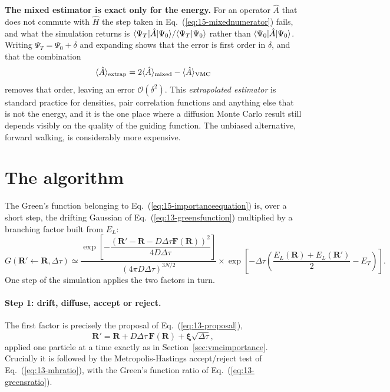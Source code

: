 \begin{notebox}
\textbf{The mixed estimator is exact only for the energy.}  For an operator
$\hat{A}$ that does not commute with $\hat{H}$ the step taken in
Eq.~(\ref{eq:15-mixednumerator}) fails, and what the simulation returns is
$\langle \Psi_T | \hat{A} | \Psi_0 \rangle/\langle \Psi_T \vert \Psi_0 \rangle$ rather than
$\langle \Psi_0 | \hat{A} | \Psi_0 \rangle$.  Writing $\Psi_T=\Psi_0+\delta$ and
expanding shows that the error is first order in $\delta$, and that the
combination
\begin{equation}
  \langle \hat{A} \rangle_{\mathrm{extrap}}
   = 2\langle \hat{A} \rangle_{\mathrm{mixed}} - \langle \hat{A} \rangle_{\mathrm{VMC}}
  \label{eq:15-extrapolated}
\end{equation}
removes that order, leaving an error $\mathcal{O}(\delta^2)$.  This
\emph{extrapolated estimator} is standard practice for densities, pair
correlation functions and anything else that is not the energy, and it is the
one place where a diffusion Monte Carlo result still depends visibly on the
quality of the guiding function.  The unbiased alternative, forward walking,
is considerably more expensive.
\end{notebox}

\section{The algorithm}
\label{sec:dmcalgorithm}

The Green's function belonging to Eq.~(\ref{eq:15-importanceequation}) is,
over a short step, the drifting Gaussian of Eq.~(\ref{eq:13-greensfunction})
multiplied by a branching factor built from $E_L$:
\begin{equation}
  G(\bm{R}'\!\leftarrow\!\bm{R},\Delta\tau)
   \simeq
     \frac{\exp\!\left[-\dfrac{\left(\bm{R}'-\bm{R}
       -D\Delta\tau\bm{F}(\bm{R})\right)^2}{4D\Delta\tau}\right]}
          {(4\pi D\Delta\tau)^{3N/2}}
   \times
     \exp\!\left[-\Delta\tau\left(
       \frac{E_L(\bm{R})+E_L(\bm{R}')}{2}-E_T\right)\right].
  \label{eq:15-fullgreens}
\end{equation}
One step of the simulation applies the two factors in turn.

\paragraph{Step 1: drift, diffuse, accept or reject.}
The first factor is precisely the proposal of Eq.~(\ref{eq:13-proposal}),
\begin{equation*}
  \bm{R}' = \bm{R} + D\Delta\tau\,\bm{F}(\bm{R})
    + \bm{\xi}\sqrt{\Delta\tau},
\end{equation*}
applied one particle at a time exactly as in
Section~\ref{sec:vmcimportance}.  Crucially it is followed by the
Metropolis-Hastings accept/reject test of Eq.~(\ref{eq:13-mhratio}), with the
Green's function ratio of Eq.~(\ref{eq:13-greensratio}).

